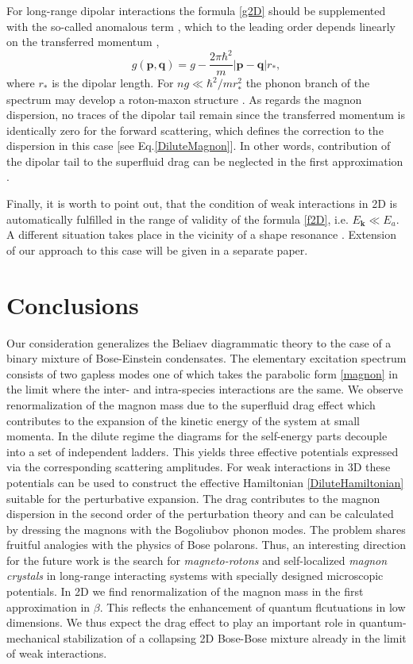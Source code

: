 \documentclass[reprint,superscriptaddress,showpacs,nofootinbib,aps,pra]{revtex4-1}
\begin{document}
For long-range dipolar interactions the formula \eqref{g2D} should be supplemented with the so-called anomalous term \cite{Landau}, which to the leading order depends linearly on the transferred momentum \cite{DipolarScattering},
\begin{equation}
g(\bm p, \bm q)=g-\frac{2\pi\hbar^2}{m} \lvert \bm p -\bm q \rvert r_\ast,
\end{equation}
where $r_\ast$ is the dipolar length. For $ng\ll \hbar^2/mr_\ast^2$ the phonon branch of the spectrum may develop a roton-maxon structure \cite{RotonSpectrum}. As regards the magnon dispersion, no traces of the dipolar tail remain since the transferred momentum is identically zero for the forward scattering, which defines the correction to the dispersion in this case [see Eq.\eqref{DiluteMagnon}]. In other words, contribution of the dipolar tail to the superfluid drag can be neglected in the first approximation \cite{footnote}.        

Finally, it is worth to point out, that the condition of weak interactions in 2D is automatically fulfilled in the range of validity of the formula \eqref{f2D}, i.e. $E_{\bm k}\ll E_a$. A different situation takes place in the vicinity of a shape resonance \cite{ResonantPairing}. Extension of our approach to this case will be given in a separate paper.

\section{Conclusions}

Our consideration generalizes the Beliaev diagrammatic theory to the case of a binary mixture of Bose-Einstein condensates. The elementary excitation spectrum consists of two gapless modes one of which takes the parabolic form \eqref{magnon} in the limit where the inter- and intra-species interactions are the same. We observe renormalization of the magnon mass due to the superfluid drag effect which contributes to the expansion of the kinetic energy of the system at small momenta. In the dilute regime the diagrams for the self-energy parts decouple into a set of independent ladders. This yields three effective potentials expressed via the corresponding scattering amplitudes. For weak interactions in 3D these potentials can be used to construct the effective Hamiltonian \eqref{DiluteHamiltonian} suitable for the perturbative expansion. The drag contributes to the magnon dispersion in the second order of the perturbation theory and can be calculated by dressing the magnons with the Bogoliubov phonon modes. The problem shares fruitful analogies with the physics of Bose polarons. Thus, an interesting direction for the future work is the search for \textit{magneto-rotons} and self-localized \textit{magnon crystals} in long-range interacting systems with specially designed microscopic potentials. In 2D we find renormalization of the magnon mass in the first approximation in $\beta$. This reflects the enhancement of quantum flcutuations in low dimensions. We thus expect the drag effect to play an important role in quantum-mechanical stabilization of a collapsing 2D Bose-Bose mixture already in the limit of weak interactions. 
\end{document}
